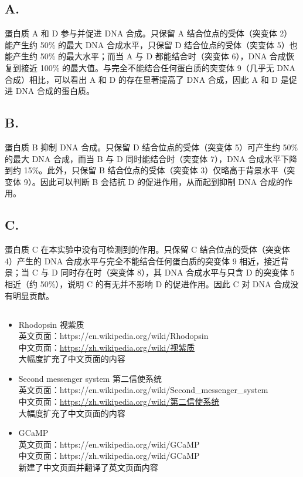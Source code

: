 \documentclass[10pt]{article}
\begin{document}
\subsection{}
\subsection*{A.}
蛋白质 A 和 D 参与并促进 DNA 合成。只保留 A 结合位点的受体（突变体 2）能产生约 50\% 的最大 DNA 合成水平，只保留 D 结合位点的受体（突变体 5）也能产生约 50\% 的最大水平；而当 A 与 D 都能结合时（突变体 6），DNA 合成恢复到接近 100\% 的最大值。与完全不能结合任何蛋白质的突变体 9（几乎无 DNA 合成）相比，可以看出 A 和 D 的存在显著提高了 DNA 合成，因此 A 和 D 是促进 DNA 合成的蛋白质。

\subsection*{B.}
蛋白质 B 抑制 DNA 合成。只保留 D 结合位点的受体（突变体 5）可产生约 50\% 的最大 DNA 合成，而当 B 与 D 同时能结合时（突变体 7），DNA 合成水平下降到约 15\%。此外，只保留 B 结合位点的受体（突变体 3）仅略高于背景水平（突变体 9）。因此可以判断 B 会拮抗 D 的促进作用，从而起到抑制 DNA 合成的作用。

\subsection*{C.}
蛋白质 C 在本实验中没有可检测到的作用。只保留 C 结合位点的受体（突变体 4）产生的 DNA 合成水平与完全不能结合任何蛋白质的突变体 9 相近，接近背景；当 C 与 D 同时存在时（突变体 8），其 DNA 合成水平与只含 D 的突变体 5 相近（约 50\%），说明 C 的有无并不影响 D 的促进作用。因此 C 对 DNA 合成没有明显贡献。

\subsection{}
\begin{itemize}
    \item Rhodopsin 视紫质\\
    英文页面：https://en.wikipedia.org/wiki/Rhodopsin \\
    中文页面：\href{https://zh.wikipedia.org/wiki/%E8%A7%86%E7%B4%AB%E8%B4%A8}{https://zh.wikipedia.org/wiki/视紫质} \\
    大幅度扩充了中文页面的内容

    \item Second messenger system 第二信使系统\\
    英文页面：https://en.wikipedia.org/wiki/Second\_messenger\_system \\
    中文页面：\href{https://zh.wikipedia.org/wiki/%E7%AC%AC%E4%BA%8C%E4%BF%A1%E4%BD%BF%E7%B3%BB%E7%BB%9F}{https://zh.wikipedia.org/wiki/第二信使系统} \\
    大幅度扩充了中文页面的内容

    \item GCaMP\\
    英文页面：https://en.wikipedia.org/wiki/GCaMP \\
    中文页面：https://zh.wikipedia.org/wiki/GCaMP \\
    新建了中文页面并翻译了英文页面内容
\end{itemize}
\end{document}
